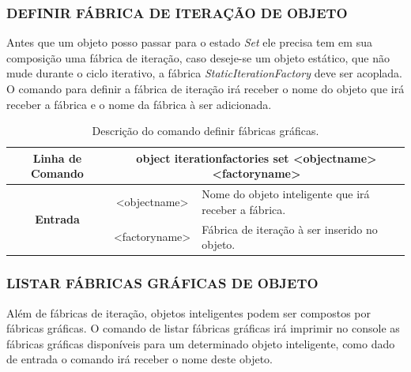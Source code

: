 \documentclass[a4paper,12pt]{monografia}
\theoremstyle{plain}
\theoremstyle{definition}
\theoremstyle{remark}
\begin{document}
\subsubsection{DEFINIR FÁBRICA DE ITERAÇÃO DE OBJETO}\label{sec:iteration_factories_set}

Antes que um objeto posso passar para o estado \textit{Set} ele precisa tem em sua composição uma fábrica de iteração, caso deseje-se um objeto estático, que não mude durante o ciclo iterativo, a fábrica \textit{StaticIterationFactory} deve ser acoplada. O comando para definir a fábrica de iteração irá receber o nome do objeto que irá receber a fábrica e o nome da fábrica à ser adicionada.

\begin{center}
	\begin{table}[!htbp]
		\begin{tabular}{|c|c|m{}|}
			\hline
			\textbf{Linha de Comando} & \multicolumn{2}{c|}{object iteration\underline{\space\space}factories set <object\underline{\space\space}name> <factory\underline{\space\space}name>} \\
			\hline
			\multirow{2}{*}{\textbf{Entrada}} & <object\underline{\space\space}name> & Nome do objeto inteligente que irá receber a fábrica. \\
			& <factory\underline{\space\space}name> & Fábrica de iteração à ser inserido no objeto. \\
			\hline
		\end{tabular}
		\caption{Descrição do comando definir fábricas gráficas.}
		\label{tab:iteration_factories_set}
	\end{table}
\end{center}

\subsubsection{LISTAR FÁBRICAS GRÁFICAS DE OBJETO}\label{sec:graphic_factories_list}

Além de fábricas de iteração, objetos inteligentes podem ser compostos por fábricas gráficas. O comando de listar fábricas gráficas irá imprimir no console as fábricas gráficas disponíveis para um determinado objeto inteligente, como dado de entrada o comando irá receber o nome deste objeto.
\end{document}
